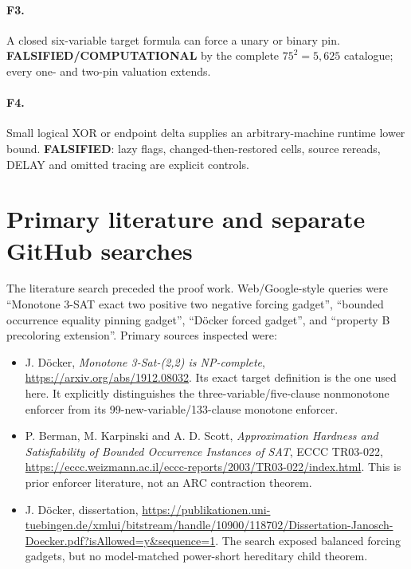 \documentclass[11pt]{article}
\begin{document}
\paragraph{F3.} A closed six-variable target formula can force a unary or
binary pin.  \textbf{FALSIFIED/COMPUTATIONAL} by the complete $75^2=5,625$
catalogue; every one- and two-pin valuation extends.

\paragraph{F4.} Small logical XOR or endpoint delta supplies an
arbitrary-machine runtime lower bound.  \textbf{FALSIFIED}: lazy flags,
changed-then-restored cells, source rereads, DELAY and omitted tracing are
explicit controls.

\section{Primary literature and separate GitHub searches}

The literature search preceded the proof work.  Web/Google-style queries were
``Monotone 3-SAT exact two positive two negative forcing gadget'', ``bounded
occurrence equality pinning gadget'', ``D\"ocker forced gadget'', and
``property B precoloring extension''.  Primary sources inspected were:
\begin{itemize}
\item J. D\"ocker, \emph{Monotone 3-Sat-(2,2) is NP-complete},
  \url{https://arxiv.org/abs/1912.08032}.  Its exact target definition is the
  one used here.  It explicitly distinguishes the three-variable/five-clause
  nonmonotone enforcer from its 99-new-variable/133-clause monotone enforcer.
\item P. Berman, M. Karpinski and A. D. Scott,
  \emph{Approximation Hardness and Satisfiability of Bounded Occurrence
  Instances of SAT}, ECCC TR03-022,
  \url{https://eccc.weizmann.ac.il/eccc-reports/2003/TR03-022/index.html}.
  This is prior enforcer literature, not an ARC contraction theorem.
\item J. D\"ocker, dissertation,
  \url{https://publikationen.uni-tuebingen.de/xmlui/bitstream/handle/10900/118702/Dissertation-Janosch-Doecker.pdf?isAllowed=y&sequence=1}.
  The search exposed balanced forcing gadgets, but no model-matched
  power-short hereditary child theorem.
\end{itemize}
\end{document}
